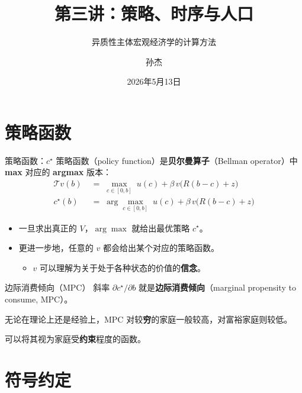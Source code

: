 \documentclass[10pt,aspectratio=169]{beamer}
\title{第三讲：策略、时序与人口}
\subtitle{异质性主体宏观经济学的计算方法}
\author{孙杰}
\institute{多伦多大学}
\date{2026年5月13日}
\begin{document}
\maketitle

\section{策略函数}

\begin{frame}{策略函数：$c^\star$}
  策略函数（policy function）是\textbf{贝尔曼算子}（Bellman operator）中 \textbf{max} 对应的 \textbf{argmax} 版本：
  \begin{align*}
    \mathcal{T}v(b)        &\;=\; \max_{c \in [0, b]} \; u(c) + \beta \, v\!\big(R(b - c) + z\big) \tag{贝尔曼算子} \\[0.4em]
    c^\star(b)  &\;=\; \arg\max_{c \in [0, b]} \; u(c) + \beta \, v\!\big(R(b - c) + z\big) \tag{策略函数}
  \end{align*}
  \begin{itemize}
    \item 一旦求出真正的 $V$，$\arg\max$ 就给出最优策略 $c^\star$。
    \item 更进一步地，任意的 $v$ 都会给出某个对应的策略函数。
    \begin{itemize}
      \item $v$ 可以理解为关于处于各种状态的价值的\textbf{信念}。
    \end{itemize}
  \end{itemize}
\end{frame}

\begin{frame}{边际消费倾向（MPC）}
  斜率 $\partial c^\star / \partial b$ 就是\textbf{边际消费倾向}（marginal propensity to consume, MPC）。

  无论在理论上还是经验上，MPC 对较\textbf{穷}的家庭一般较高，对富裕家庭则较低。

  可以将其视为家庭受\textbf{约束}程度的函数。
\end{frame}

\section{符号约定}
\end{document}
